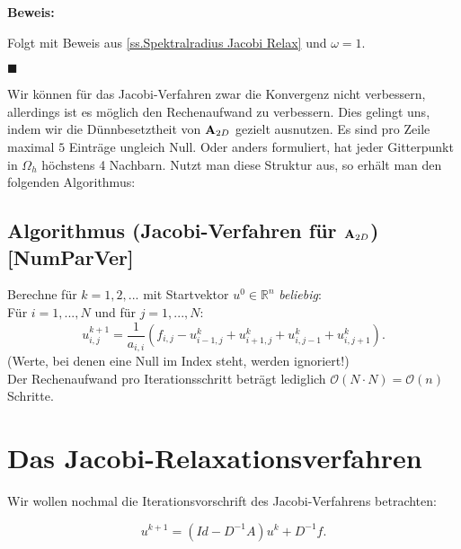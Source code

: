 \textbf{Beweis:}\label{b.Spektral Jacobi}

Folgt mit Beweis aus \autoref{ss.Spektralradius Jacobi Relax} und $\omega = 1$.
\begin{flushright}
$\blacksquare$
\end{flushright}

Wir können für das Jacobi-Verfahren zwar die Konvergenz nicht verbessern, allerdings ist es möglich den Rechenaufwand zu verbessern. Dies gelingt uns, indem wir die Dünnbesetztheit von ${\textbf{A}}_{2D}$ gezielt ausnutzen. Es sind pro Zeile maximal $5$ Einträge ungleich Null. Oder anders formuliert, hat jeder Gitterpunkt in $\Omega_{h}$ höchstens 4 Nachbarn. Nutzt man diese Struktur aus, so erhält man den folgenden Algorithmus:

\subsection{Algorithmus (Jacobi-Verfahren für ${\textbf{A}}_{2D}$) [NumParVer]}\label{ss.Jacobi für Poisson}

Berechne für $k = 1,2,...$ mit Startvektor $u^{0} \in \mathbb{R}^{n}$ \textit{beliebig}:\\
Für $i = 1,...,N$ und für $j = 1,...,N$:
\begin{equation}
u^{k+1}_{i,j} =  \frac {1} {a_{i,i}} (f_{i,j} - u^{k}_{i-1,j} + u^{k}_{i+1,j} + u^{k}_{i,j-1} + u^{k}_{i,j+1}).
\end{equation}
(Werte, bei denen eine Null im Index steht, werden ignoriert!)\\
Der Rechenaufwand pro Iterationsschritt beträgt lediglich $\mathcal{O}(N \cdot N)=\mathcal{O}(n)$ Schritte.

\section{Das Jacobi-Relaxationsverfahren}\label{s.Jacobi Relaxation}

Wir wollen nochmal die Iterationsvorschrift des Jacobi-Verfahrens betrachten:

\begin{equation}
u^{k+1} = (Id - D^{-1}A)u^{k} + D^{-1}f.
\end{equation}

